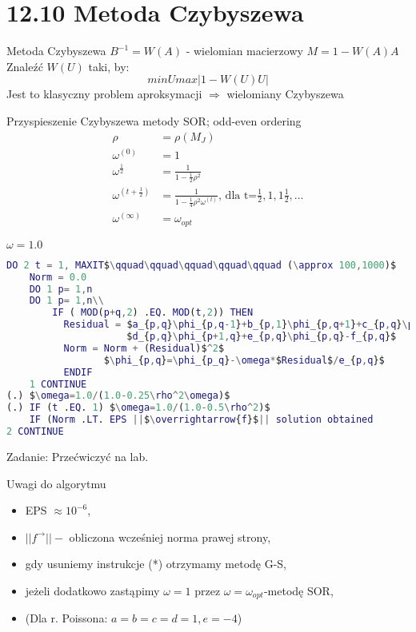 \section{12.10 Metoda Czybyszewa}

\begin{frame}{Metoda Czybyszewa}
  $B^{-1}=W(A)$ - wielomian macierzowy $M=1-W(A)A$ Znaleźć $W(U)$ taki, by:
  $$minUmax|1-W(U)U|$$
  Jest to klasyczny problem aproksymacji $\Rightarrow$ wielomiany Czybyszewa
\end{frame}

\begin{frame}
  \begin{block}{Przyspieszenie Czybyszewa metody SOR; odd-even ordering}
    \begin{align*}
    \rho &= \rho(M_J)\\
    \omega^{(0)}&=1\\
    \omega^{\frac{1}{2}}&=\frac{1}{1-\frac{1}{2}\rho^2}\\
    \omega^{(t+\frac{1}{2})}&=\frac{1}{1-\frac{1}{4}\rho^2\omega^{(t)}}\text{, dla t=}\frac{1}{2},1,1\frac{1}{2},...\\
    \omega^{(\infty)} &= \omega_{opt}
    \end{align*}
  \end{block}
\end{frame}

\begin{frame}[fragile]{}
 $\omega=1.0$
\begin{lstlisting}[language=Matlab, mathescape]
DO 2 t = 1, MAXIT$\qquad\qquad\qquad\qquad\qquad (\approx 100,1000)$
    Norm = 0.0
    DO 1 p= 1,n
    DO 1 p= 1,n\\
        IF ( MOD(p+q,2) .EQ. MOD(t,2)) THEN
          Residual = $a_{p,q}\phi_{p,q-1}+b_{p,1}\phi_{p,q+1}+c_{p,q}\phi_{p-1,q}+$
                     $d_{p,q}\phi_{p+1,q}+e_{p,q}\phi_{p,q}-f_{p,q}$
          Norm = Norm + (Residual)$^2$
                 $\phi_{p,q}=\phi_{p_q}-\omega*$Residual$/e_{p,q}$
          ENDIF
    1 CONTINUE
(.) $\omega=1.0/(1.0-0.25\rho^2\omega)$
(.) IF (t .EQ. 1) $\omega=1.0/(1.0-0.5\rho^2)$
    IF (Norm .LT. EPS ||$\overrightarrow{f}$|| solution obtained
2 CONTINUE
\end{lstlisting}
  \hfill\hfill Zadanie: Przećwiczyć na lab.
\end{frame}

\begin{frame}{}
  \begin{block}{Uwagi do algorytmu}
    \begin{itemize}
      \item EPS $\approx 10^{-6}$,
      \item $||f^\rightarrow|| -$ obliczona wcześniej norma prawej strony,
      \item gdy usuniemy instrukcje (*) otrzymamy metodę G-S,
      \item jeżeli dodatkowo zastąpimy $\omega=1$ przez $\omega=\omega_{opt}$-metodę SOR,
      \item (Dla r. Poissona: $a=b=c=d=1, e=-4$)
    \end{itemize}
  \end{block}
\end{frame}

